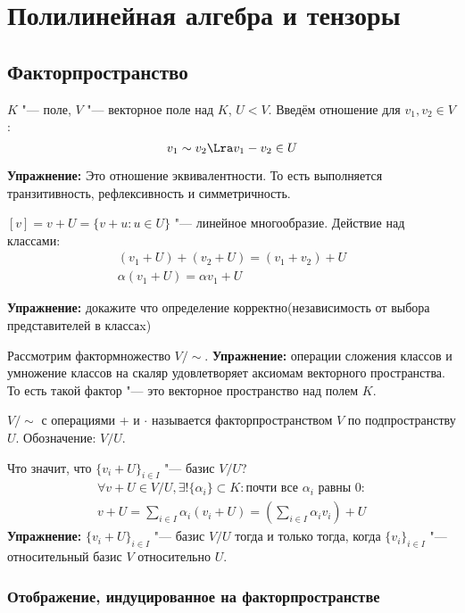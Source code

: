 ﻿\chapter{Полилинейная алгебра и тензоры}

\section{Факторпространство}

\begin{Def}
	$K$ "--- поле, $V$ "--- векторное поле над $K$, $U < V$.
	Введём отношение для $v_1, v_2 \in V$:
	\[ v_1 \sim v_2 \Lra v_1 - v_2 \in U \]
\end{Def}
\textbf{Упражнение:} Это отношение эквивалентности. То есть выполняется транзитивность, рефлексивность и симметричность.

\begin{Def}
	$[v] = v + U = \{v + u\colon u \in U\}$ "--- линейное многообразие.
	Действие над классами:
	\begin{gather*}
		(v_1 + U) + (v_2 + U) = (v_1 + v_2) + U \\
		\alpha(v_1 + U) = \alpha v_1 + U
	\end{gather*}
\end{Def}
\textbf{Упражнение:} докажите что определение корректно(независимость от выбора представителей в классаx)

Рассмотрим фактормножество $V/\sim$.
\textbf{Упражнение:} операции сложения классов и умножение классов на скаляр удовлетворяет аксиомам векторного пространства. То есть
такой фактор "--- это векторное пространство над полем $K$.

\begin{Def}
	$V/\sim$ с операциями + и $\cdot$ называется факторпространством $V$ по подпространству $U$.
	Обозначение: $V/U$.
\end{Def}
Что значит, что $\{v_i + U\}_{i \in I}$ "--- базис $V/U$?
\begin{gather*}
	\forall v + U \in V/U, \exists! \{\alpha_i\} \subset K\colon \text{почти все $\alpha_i$ равны 0}\colon \\
	v + U = \sum_{i \in I}\alpha_i(v_i + U) = \left(\sum_{i \in I}\alpha_i v_i\right) + U
\end{gather*}
\textbf{Упражнение:}
$\{v_i + U\}_{i \in I}$  "--- базис $V/U$ тогда и только тогда, когда
$\{v_i\}_{i \in I}$ "--- относительный базис $V$ относительно $U$.

\subsection{Отображение, индуцированное на факторпространстве}

